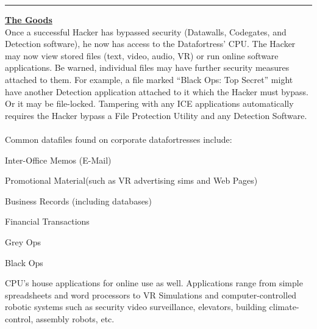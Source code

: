 \documentclass[11pt,twoside,a4paper]{article}
\newenvironment{local_enumerate}{
\begin{enumerate}
     \setlength{\itemsep}{1pt}
     \setlength{\parskip}{0pt}
     \setlength{\parsep}{0pt}}
{\end{enumerate}
}
\begin{document}
\begin{center} \rule{0.85\textwidth}{0.01cm} \end{center}


\begin{multicols}{2}

\textbf{\underline{\large The Goods}}~\\
Once a successful Hacker has bypassed security (Datawalls, Codegates, and Detection software), he now has access to the Datafortress' CPU. The Hacker may now view stored files (text, video, audio, VR) or run online software applications. Be warned, individual files may have further security measures attached to them. For example, a file marked ``Black Ops: Top Secret'' might have another Detection application attached to it which the Hacker must bypass. Or it may be file-locked. Tampering with any ICE applications automatically requires the Hacker bypass a File Protection Utility and any Detection Software. ~\\

Common datafiles found on corporate datafortresses include:
\begin{local_enumerate}
	\item Inter-Office Memos (E-Mail)
	\item Promotional Material(such as VR advertising sims and Web Pages)
	\item Business Records (including databases)
	\item Financial Transactions
	\item Grey Ops
	\item Black Ops
\end{local_enumerate}

CPU's house applications for online use as well. Applications range from simple spreadsheets and word processors to VR Simulations and computer-controlled robotic systems such as security video surveillance, elevators, building climate-control, assembly robots, etc. ~\\


\end{multicols}
\end{document}
